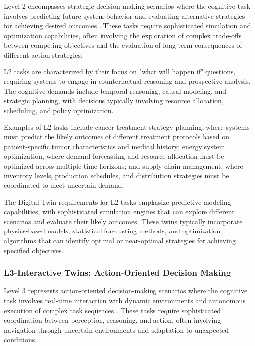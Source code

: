 Level 2 encompasses strategic decision-making scenarios where the cognitive task involves predicting future system behavior and evaluating alternative strategies for achieving desired outcomes \cite{sutton2018reinforcement, kaelbling1996reinforcement}. These tasks require sophisticated simulation and optimization capabilities, often involving the exploration of complex trade-offs between competing objectives and the evaluation of long-term consequences of different action strategies.

L2 tasks are characterized by their focus on "what will happen if" questions, requiring systems to engage in counterfactual reasoning and prospective analysis. The cognitive demands include temporal reasoning, causal modeling, and strategic planning, with decisions typically involving resource allocation, scheduling, and policy optimization.

Examples of L2 tasks include cancer treatment strategy planning, where systems must predict the likely outcomes of different treatment protocols based on patient-specific tumor characteristics and medical history; energy system optimization, where demand forecasting and resource allocation must be optimized across multiple time horizons; and supply chain management, where inventory levels, production schedules, and distribution strategies must be coordinated to meet uncertain demand.

The Digital Twin requirements for L2 tasks emphasize predictive modeling capabilities, with sophisticated simulation engines that can explore different scenarios and evaluate their likely outcomes. These twins typically incorporate physics-based models, statistical forecasting methods, and optimization algorithms that can identify optimal or near-optimal strategies for achieving specified objectives.

\subsubsection{L3-Interactive Twins: Action-Oriented Decision Making}

Level 3 represents action-oriented decision-making scenarios where the cognitive task involves real-time interaction with dynamic environments and autonomous execution of complex task sequences \cite{duan2022survey, kober2013reinforcement}. These tasks require sophisticated coordination between perception, reasoning, and action, often involving navigation through uncertain environments and adaptation to unexpected conditions.

